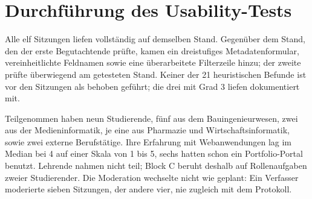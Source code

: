 \section{Durchführung des Usability-Tests}
\label{sec:durchfuehrung}

Alle elf Sitzungen liefen vollständig auf demselben Stand. Gegenüber dem Stand, den der erste Begutachtende prüfte, kamen ein dreistufiges Metadatenformular, vereinheitlichte Feldnamen sowie eine überarbeitete Filterzeile hinzu; der zweite prüfte überwiegend am getesteten Stand. Keiner der 21 heuristischen Befunde ist vor den Sitzungen als behoben geführt; die drei mit Grad 3 liefen dokumentiert mit.

Teilgenommen haben neun Studierende, fünf aus dem Bauingenieurwesen, zwei aus der Medieninformatik, je eine aus Pharmazie und Wirtschaftsinformatik, sowie zwei externe Berufstätige. Ihre Erfahrung mit Webanwendungen lag im Median bei 4 auf einer Skala von 1 bis 5, sechs hatten schon ein Portfolio-Portal benutzt. Lehrende nahmen nicht teil; Block C beruht deshalb auf Rollenaufgaben zweier Studierender. Die Moderation wechselte nicht wie geplant: Ein Verfasser moderierte sieben Sitzungen, der andere vier, nie zugleich mit dem Protokoll.


